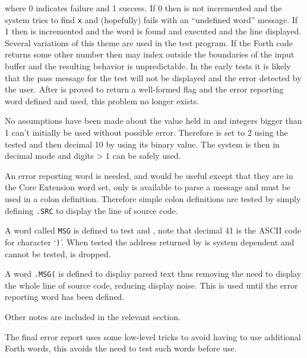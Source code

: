 where 0 indicates failure and 1 success. If 0 then  is
not incremented and the system tries to find \texttt{x}
and (hopefully) fails with an ``undefined word'' message. If 1
then  is incremented and the word 
is found and executed and the line displayed. Several variations
of this theme are used in the test program. If the Forth code
returns some other number then  may index outside
the boundaries of the input buffer and the resulting behavior is
unpredictable. In the early tests it is likely that the pass message
for the test will not be displayed and the error detected by the user.
After \word{=} is proved to return a well-formed flag and the error
reporting word defined and used, this problem no longer exists.
 
No assumptions have been made about the value held in
 and integers bigger than 1 can't initially be used
without possible error. Therefore  is set to 2 using
the tested  and then decimal 10 by using its binary value.
The system is then in decimal mode and digits > 1 can be safely used.

An error reporting word is needed,  and 
would be useful except that they are in the Core Extension word set,
only  is available to parse a message and must be used
in a colon definition. Therefore simple colon definitions are tested
by simply defining \texttt{.SRC} to display the line of source code.

A word called \texttt{MSG} is defined to test  and
, note that decimal 41 is the ASCII code for character
`\texttt{)}'.  When tested the address returned by 
is system dependent and cannot be tested, is dropped.

A word \texttt{.MSG(} is defined to display parsed text thus removing
the need to display the whole line of source code, reducing display
noise. This is used until the error reporting word has been defined.

Other notes are included in the relevant section.

The final error report uses some low-level tricks to avoid having to
use additional Forth words, this avoids the need to test such words
before use.

